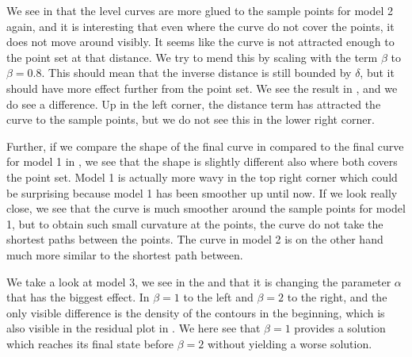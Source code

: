 We see in  that the level curves are more glued to the sample points for model 2 again, and it is interesting that even where the curve do not cover the points, it does not move around visibly. It seems like the curve is not attracted enough to the point set at that distance. We try to mend this by scaling with the term $\beta$ to $\beta=0.8$. This should mean that the inverse distance is still bounded by $\delta$, but it should have more effect further from the point set. We see the result in , and we do see a difference. Up in the left corner, the distance term has attracted the curve to the sample points, but we do not see this in the lower right corner. 

Further, if we compare the shape of the final curve in  compared to the final curve for model 1 in , we see that the shape is slightly different also where both covers the point set. Model 1 is actually more wavy in the top right corner which could be surprising because model 1 has been smoother up until now. If we look really close, we see that the curve is much smoother around the sample points for model 1, but to obtain such small curvature at the points, the curve do not take the shortest paths between the points. The curve in model 2 is on the other hand much more similar to the shortest path between.


We take a look at model 3, we see in the  and  that it is changing the parameter $\alpha$ that has the biggest effect. In  $\beta=1$ to the left and $\beta=2$ to the right, and the only visible difference is the density of the contours in the beginning, which is also visible in the residual plot in . We here see that $\beta=1$ provides a solution which reaches its final state before $\beta=2$ without yielding a worse solution.

